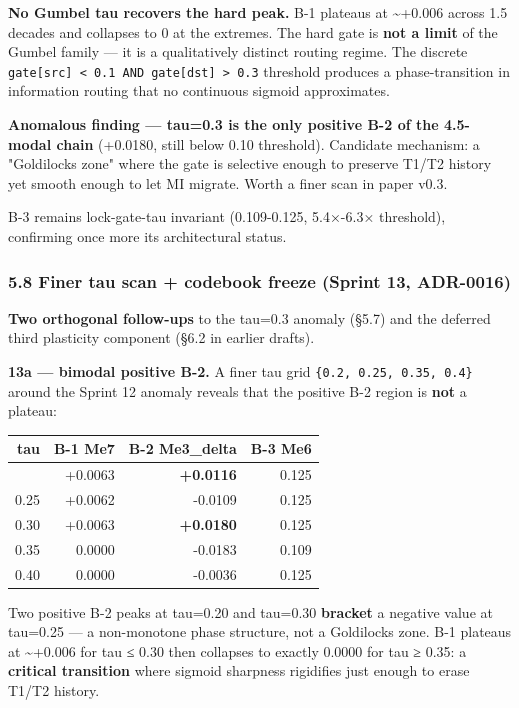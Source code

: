 \documentclass[
]{article}
\newcounter{none} %
\begin{document}
\textbf{No Gumbel tau recovers the hard peak.} B-1 plateaus at
\textasciitilde+0.006 across 1.5 decades and collapses to 0 at the
extremes. The hard gate is \textbf{not a limit} of the Gumbel family ---
it is a qualitatively distinct routing regime. The discrete
\texttt{gate{[}src{]}\ \textless{}\ 0.1\ AND\ gate{[}dst{]}\ \textgreater{}\ 0.3}
threshold produces a phase-transition in information routing that no
continuous sigmoid approximates.

\textbf{Anomalous finding --- tau=0.3 is the only positive B-2 of the
4.5-modal chain} (+0.0180, still below 0.10 threshold). Candidate
mechanism: a "Goldilocks zone" where the gate is selective enough to
preserve T1/T2 history yet smooth enough to let MI migrate. Worth a
finer scan in paper v0.3.

B-3 remains lock-gate-tau invariant (0.109-0.125, 5.4×-6.3× threshold),
confirming once more its architectural status.

\subsubsection{5.8 Finer tau scan + codebook freeze (Sprint 13,
ADR-0016)}\label{58-finer-tau-scan--codebook-freeze-sprint-13-adr-0016}

\textbf{Two orthogonal follow-ups} to the tau=0.3 anomaly (§5.7) and the
deferred third plasticity component (§6.2 in earlier drafts).

\textbf{13a --- bimodal positive B-2.} A finer tau grid
\texttt{\{0.2,\ 0.25,\ 0.35,\ 0.4\}} around the Sprint 12 anomaly
reveals that the positive B-2 region is \textbf{not} a plateau:

{\def\LTcaptype{none} %
\begin{longtable}[]{@{}rrrr@{}}
\toprule\noalign{}
tau & B-1 Me7 & B-2 Me3\_delta & B-3 Me6 \\
\midrule\noalign{}
\endhead
\bottomrule\noalign{}
\endlastfoot
0.20 & +0.0063 & \textbf{+0.0116} & 0.125 \\
0.25 & +0.0062 & -0.0109 & 0.125 \\
0.30 & +0.0063 & \textbf{+0.0180} & 0.125 \\
0.35 & 0.0000 & -0.0183 & 0.109 \\
0.40 & 0.0000 & -0.0036 & 0.125 \\
\end{longtable}
}

Two positive B-2 peaks at tau=0.20 and tau=0.30 \textbf{bracket} a
negative value at tau=0.25 --- a non-monotone phase structure, not a
Goldilocks zone. B-1 plateaus at \textasciitilde+0.006 for tau ≤ 0.30
then collapses to exactly 0.0000 for tau ≥ 0.35: a \textbf{critical
transition} where sigmoid sharpness rigidifies just enough to erase
T1/T2 history.
\end{document}
